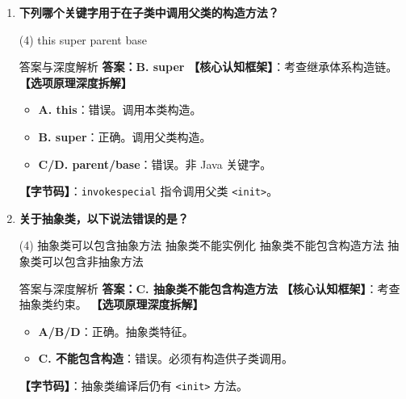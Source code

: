 \documentclass[12pt, a4paper]{ctexart}
\newcommand{\code}[1]{\texttt{#1}}
\begin{document}
\begin{enumerate}[label=\textbf{\arabic*.}, itemsep=1em]
    \item \textbf{下列哪个关键字用于在子类中调用父类的构造方法？}
    \begin{tasks}(4)
        \task this \task super \task parent \task base
    \end{tasks}
    \begin{bluebox}{答案与深度解析}
    \textbf{答案：B. super}
    \textbf{【核心认知框架】}：考查继承体系构造链。
    \textbf{【选项原理深度拆解】}
    \begin{itemize}[leftmargin=*, nosep]
        \item \textbf{A. this}：错误。调用本类构造。
        \item \textbf{B. super}：正确。调用父类构造。
        \item \textbf{C/D. parent/base}：错误。非 Java 关键字。
    \end{itemize}
    \textbf{【字节码】}：\code{invokespecial} 指令调用父类 \code{<init>}。
    \end{bluebox}

    \item \textbf{关于抽象类，以下说法错误的是？}
    \begin{tasks}(4)
        \task 抽象类可以包含抽象方法 \task 抽象类不能实例化
        \task 抽象类不能包含构造方法 \task 抽象类可以包含非抽象方法
    \end{tasks}
    \begin{bluebox}{答案与深度解析}
    \textbf{答案：C. 抽象类不能包含构造方法}
    \textbf{【核心认知框架】}：考查抽象类约束。
    \textbf{【选项原理深度拆解】}
    \begin{itemize}[leftmargin=*, nosep]
        \item \textbf{A/B/D}：正确。抽象类特征。
        \item \textbf{C. 不能包含构造}：错误。必须有构造供子类调用。
    \end{itemize}
    \textbf{【字节码】}：抽象类编译后仍有 \code{<init>} 方法。
    \end{bluebox}


\end{enumerate}
\end{document}
